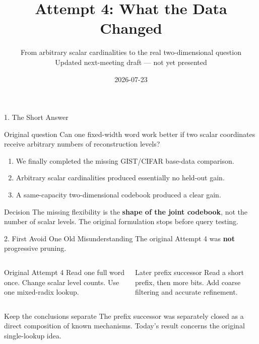 \documentclass[aspectratio=169]{beamer}
\title{Attempt 4: What the Data Changed}
\subtitle{\texorpdfstring{From arbitrary scalar cardinalities to the real two-dimensional question\\[2mm]\small Updated next-meeting draft --- not yet presented}{From arbitrary scalar cardinalities to the real two-dimensional question}}
\author{}
\date{2026-07-23}
\begin{document}
\begin{frame}\titlepage\end{frame}

\begin{frame}{1. The Short Answer}
\begin{block}{Original question}
Can one fixed-width word work better if two scalar coordinates receive arbitrary numbers of reconstruction levels?
\end{block}
\begin{enumerate}
  \item We finally completed the missing GIST/CIFAR base-data comparison.
  \item Arbitrary scalar cardinalities produced essentially no held-out gain.
  \item A same-capacity two-dimensional codebook produced a clear gain.
\end{enumerate}
\begin{alertblock}{Decision}
The missing flexibility is the \textbf{shape of the joint codebook}, not the number of scalar levels. The original formulation stops before query testing.
\end{alertblock}
\end{frame}

\begin{frame}{2. First Avoid One Old Misunderstanding}
The original Attempt 4 was \textbf{not} progressive pruning.
\begin{columns}[T]
\begin{block}{Original Attempt 4}
Read one full word once. Change scalar level counts. Use one mixed-radix lookup.
\end{block}
\begin{block}{Later prefix successor}
Read a short prefix, then more bits. Add coarse filtering and accurate refinement.
\end{block}
\end{columns}
\begin{alertblock}{Keep the conclusions separate}
The prefix successor was separately closed as a direct composition of known mechanisms. Today's result concerns the original single-lookup idea.
\end{alertblock}
\end{frame}
\end{document}
